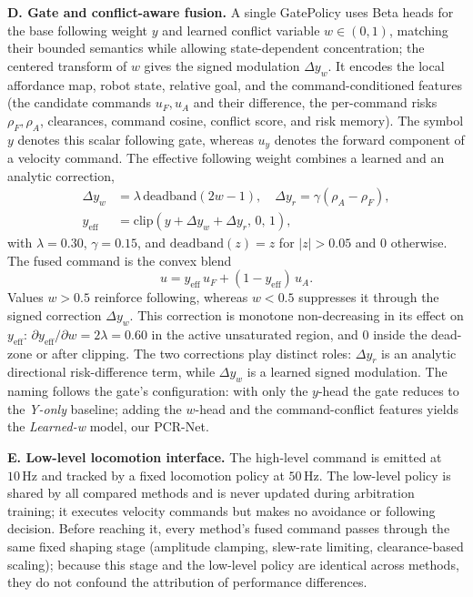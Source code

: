 \documentclass[letterpaper, 10 pt, conference]{ieeeconf}
\newcommand{\uF}{u_{F}}
\newcommand{\uA}{u_{A}}
\newcommand{\yeff}{y_{\mathrm{eff}}}
\newcommand{\rFdir}{\rho_F}
\newcommand{\rAdir}{\rho_A}
\newcommand{\dyrdir}{\Delta y_r}
\begin{document}
\textbf{D. Gate and conflict-aware fusion.}
A single GatePolicy uses Beta heads for the base following weight $y$ and
learned conflict variable $w\in(0,1)$, matching their bounded semantics while
allowing state-dependent concentration; the centered transform of $w$ gives
the signed modulation $\Delta y_w$. It encodes the local
affordance map, robot state, relative goal, and the command-conditioned
features (the candidate commands
$\uF,\uA$ and their difference, the per-command risks $\rFdir,\rAdir$,
clearances, command cosine, conflict score, and risk memory). The
symbol $y$ denotes this scalar following gate, whereas $u_y$ denotes the
forward component of a velocity command. The effective following weight
combines a learned and an analytic correction,
\begin{align}
\Delta y_w &= \lambda\,\mathrm{deadband}(2w-1),\quad
\dyrdir = \gamma(\rAdir-\rFdir), \\
\yeff &= \mathrm{clip}\!\left(y+\Delta y_w+\dyrdir,\,0,\,1\right),
\end{align}
with $\lambda=0.30$, $\gamma=0.15$, and
$\mathrm{deadband}(z)=z$ for $|z|>0.05$ and $0$ otherwise. The fused
command is the convex blend
\begin{equation}
u = \yeff\,\uF + (1-\yeff)\,\uA .
\label{eq:fusion}
\end{equation}
Values $w>0.5$ reinforce following, whereas $w<0.5$ suppresses it through
the signed correction $\Delta y_w$. This correction is monotone non-decreasing in
its effect on $\yeff$: $\partial\yeff/\partial w=2\lambda=0.60$ in the
active unsaturated region, and $0$ inside the dead-zone or after clipping.
The two corrections play distinct roles: $\dyrdir$ is an analytic
directional risk-difference term, while $\Delta y_w$ is a learned signed
modulation.
The naming follows the gate's configuration: with only the $y$-head the
gate reduces to the \emph{Y-only} baseline; adding the $w$-head and the
command-conflict features yields the \emph{Learned-w} model, our PCR-Net.

\textbf{E. Low-level locomotion interface.}
The high-level command is emitted at $10\,\mathrm{Hz}$ and tracked by a
fixed locomotion policy at $50\,\mathrm{Hz}$. The low-level policy is
shared by all compared methods and is never updated during arbitration
training; it executes velocity commands but makes no avoidance or
following decision. Before reaching it, every method's fused command
passes through the same fixed shaping stage (amplitude clamping,
slew-rate limiting, clearance-based scaling); because this stage and the
low-level policy are identical across methods, they do not confound the
attribution of performance differences.
\end{document}
